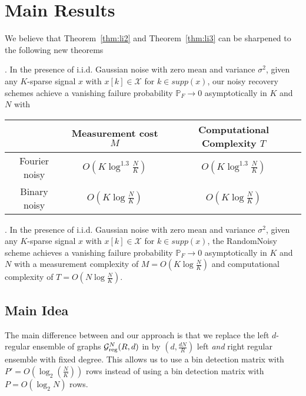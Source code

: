 \documentclass[journal,draft,onecolumn]{IEEEtran}
\begin{document}
\section{Main Results}
We believe that Theorem~\ref{thm:li2} and Theorem~\ref{thm:li3} can be sharpened to the following new theorems
\begin{theorem}\label{thm:our1}. In the presence of i.i.d. Gaussian noise with zero mean and
variance $\sigma^2$, given any $K$-sparse signal $x$ with $x[k] \in \mathcal{X}$ for $k \in supp (x)$, our noisy recovery schemes achieve a vanishing failure probability $\mathbb{P}_F \rightarrow 0$ asymptotically in $K$ and $N$ with
\begin{center}
\begin{tabular}{|c|c|c|}
  \hline
   & Measurement cost $M$ &  Computational Complexity $T$ \\
  \hline
  Fourier noisy & $O\left(K \log^{1.3} \frac{N}{K} \right)$ & $O\left(K \log^{1.3} \frac{N}{K} \right)$ \\
  \hline
  Binary noisy & $O\left(K \log \frac{N}{K} \right)$  & $O\left(K \log \frac{N}{K} \right)$ \\
  \hline
\end{tabular}
\end{center}
\end{theorem}

\begin{theorem} \label{thm:our2}. In the presence of i.i.d. Gaussian noise with zero mean and
variance $\sigma^2$, given any $K$-sparse signal $x$ with $x[k] \in \mathcal{X}$ for $k \in supp (x)$, the RandomNoisy scheme achieves a vanishing failure probability $\mathbb{P}_F \rightarrow 0$ asymptotically in $K$ and $N$ with a measurement complexity of $M = O \left( K \log \frac{N}{K} \right)$ and computational complexity of $T = O \left( N \log \frac{N}{K} \right)$.
\end{theorem}

\subsection{Main Idea}
The main difference between \cite{li2015subdraft} and our approach is that we replace the left $d$-regular ensemble of graphs $\mathcal{G}^N_{\rm reg}(R,d)$ in \cite{li2015subdraft} by $\left(d, \frac{dN}{R} \right)$ left {\em and} right regular ensemble with fixed degree. This allows us to use a bin detection matrix with $P' = O\left(\log_2 \left( \frac{N}{K} \right)\right)$ rows
instead of using a bin detection matrix with $P = O(\log_2 N)$ rows.
\end{document}
